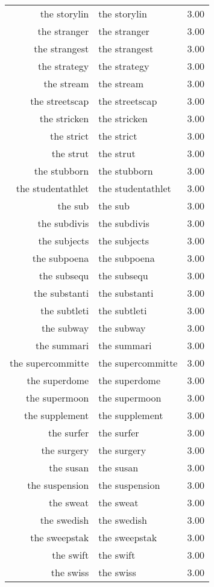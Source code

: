 \begin{table}[ht]
\begin{tabular}{rlr}
  the storylin & the storylin & 3.00 \\ 
  the stranger & the stranger & 3.00 \\ 
  the strangest & the strangest & 3.00 \\ 
  the strategy & the strategy & 3.00 \\ 
  the stream & the stream & 3.00 \\ 
  the streetscap & the streetscap & 3.00 \\ 
  the stricken & the stricken & 3.00 \\ 
  the strict & the strict & 3.00 \\ 
  the strut & the strut & 3.00 \\ 
  the stubborn & the stubborn & 3.00 \\ 
  the studentathlet & the studentathlet & 3.00 \\ 
  the sub & the sub & 3.00 \\ 
  the subdivis & the subdivis & 3.00 \\ 
  the subjects & the subjects & 3.00 \\ 
  the subpoena & the subpoena & 3.00 \\ 
  the subsequ & the subsequ & 3.00 \\ 
  the substanti & the substanti & 3.00 \\ 
  the subtleti & the subtleti & 3.00 \\ 
  the subway & the subway & 3.00 \\ 
  the summari & the summari & 3.00 \\ 
  the supercommitte & the supercommitte & 3.00 \\ 
  the superdome & the superdome & 3.00 \\ 
  the supermoon & the supermoon & 3.00 \\ 
  the supplement & the supplement & 3.00 \\ 
  the surfer & the surfer & 3.00 \\ 
  the surgery & the surgery & 3.00 \\ 
  the susan & the susan & 3.00 \\ 
  the suspension & the suspension & 3.00 \\ 
  the sweat & the sweat & 3.00 \\ 
  the swedish & the swedish & 3.00 \\ 
  the sweepstak & the sweepstak & 3.00 \\ 
  the swift & the swift & 3.00 \\ 
  the swiss & the swiss & 3.00 \\ 

\end{tabular}
\end{table}
